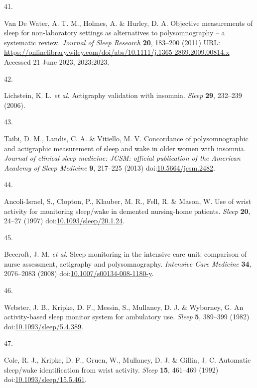 \documentclass[
  9pt,
]{scrbook}
\newlength{\cslhangindent}
\newlength{\csllabelwidth}
\newlength{\cslentryspacingunit} %
\newenvironment{CSLReferences}[2] %
 {%
  \setlength{\parindent}{0pt}
  \ifodd #1
  \let\oldpar\par
  \def\par{\hangindent=\cslhangindent\oldpar}
  \fi
  \setlength{\parskip}{#2\cslentryspacingunit}
 }%
 {}
\newcommand{\CSLLeftMargin}[1]{\parbox[t]{\csllabelwidth}{#1}}
\newcommand{\CSLRightInline}[1]{\parbox[t]{\linewidth - \csllabelwidth}{#1}\break}
\begin{document}
\begin{CSLReferences}{0}{0}
\leavevmode{}%
\CSLLeftMargin{41. }%
\CSLRightInline{Van De Water, A. T. M., Holmes, A. \& Hurley, D. A.
Objective measurements of sleep for non-laboratory settings as
alternatives to polysomnography -- a systematic review. \emph{Journal of
Sleep Research} \textbf{20}, 183--200 (2011) URL:
\url{https://onlinelibrary.wiley.com/doi/abs/10.1111/j.1365-2869.2009.00814.x}
Accessed 21 June 2023, 2023:2023.}

\leavevmode{}%
\CSLLeftMargin{42. }%
\CSLRightInline{Lichstein, K. L. \emph{et al.} Actigraphy validation
with insomnia. \emph{Sleep} \textbf{29}, 232--239 (2006).}

\leavevmode{}%
\CSLLeftMargin{43. }%
\CSLRightInline{Taibi, D. M., Landis, C. A. \& Vitiello, M. V.
Concordance of polysomnographic and actigraphic measurement of sleep and
wake in older women with insomnia. \emph{Journal of clinical sleep
medicine: JCSM: official publication of the American Academy of Sleep
Medicine} \textbf{9}, 217--225 (2013)
doi:\href{https://doi.org/10.5664/jcsm.2482}{10.5664/jcsm.2482}.}

\leavevmode{}%
\CSLLeftMargin{44. }%
\CSLRightInline{Ancoli-Israel, S., Clopton, P., Klauber, M. R., Fell, R.
\& Mason, W. Use of wrist activity for monitoring sleep/wake in demented
nursing-home patients. \emph{Sleep} \textbf{20}, 24--27 (1997)
doi:\href{https://doi.org/10.1093/sleep/20.1.24}{10.1093/sleep/20.1.24}.}

\leavevmode{}%
\CSLLeftMargin{45. }%
\CSLRightInline{Beecroft, J. M. \emph{et al.} Sleep monitoring in the
intensive care unit: comparison of nurse assessment, actigraphy and
polysomnography. \emph{Intensive Care Medicine} \textbf{34}, 2076--2083
(2008)
doi:\href{https://doi.org/10.1007/s00134-008-1180-y}{10.1007/s00134-008-1180-y}.}

\leavevmode{}%
\CSLLeftMargin{46. }%
\CSLRightInline{Webster, J. B., Kripke, D. F., Messin, S., Mullaney, D.
J. \& Wyborney, G. An activity-based sleep monitor system for ambulatory
use. \emph{Sleep} \textbf{5}, 389--399 (1982)
doi:\href{https://doi.org/10.1093/sleep/5.4.389}{10.1093/sleep/5.4.389}.}

\leavevmode{}%
\CSLLeftMargin{47. }%
\CSLRightInline{Cole, R. J., Kripke, D. F., Gruen, W., Mullaney, D. J.
\& Gillin, J. C. Automatic sleep/wake identification from wrist
activity. \emph{Sleep} \textbf{15}, 461--469 (1992)
doi:\href{https://doi.org/10.1093/sleep/15.5.461}{10.1093/sleep/15.5.461}.}


\end{CSLReferences}
\end{document}
